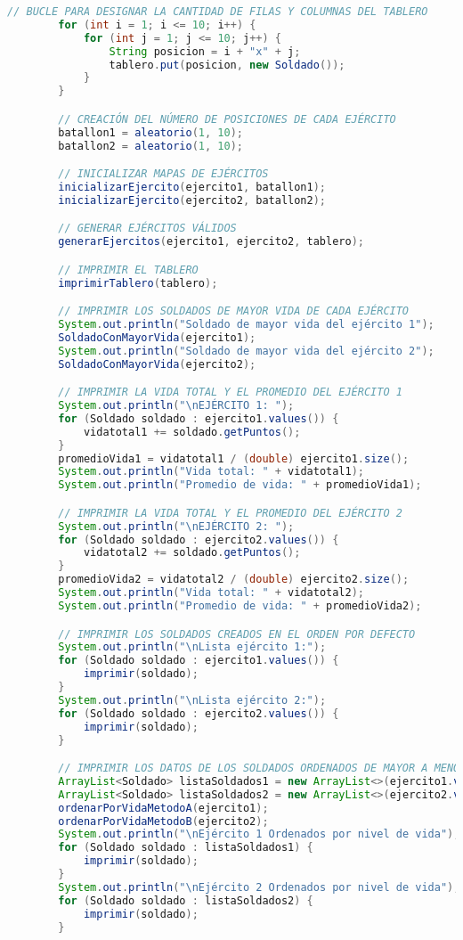 \documentclass{article}
\begin{document}
\begin{itemize}
\begin{itemize}
\begin{lstlisting}[language=java]
        // BUCLE PARA DESIGNAR LA CANTIDAD DE FILAS Y COLUMNAS DEL TABLERO
        for (int i = 1; i <= 10; i++) {
            for (int j = 1; j <= 10; j++) {
                String posicion = i + "x" + j;
                tablero.put(posicion, new Soldado());
            }
        }

        // CREACIÓN DEL NÚMERO DE POSICIONES DE CADA EJÉRCITO
        batallon1 = aleatorio(1, 10);
        batallon2 = aleatorio(1, 10);

        // INICIALIZAR MAPAS DE EJÉRCITOS
        inicializarEjercito(ejercito1, batallon1);
        inicializarEjercito(ejercito2, batallon2);

        // GENERAR EJÉRCITOS VÁLIDOS
        generarEjercitos(ejercito1, ejercito2, tablero);

        // IMPRIMIR EL TABLERO
        imprimirTablero(tablero);

        // IMPRIMIR LOS SOLDADOS DE MAYOR VIDA DE CADA EJÉRCITO
        System.out.println("Soldado de mayor vida del ejército 1");
        SoldadoConMayorVida(ejercito1);
        System.out.println("Soldado de mayor vida del ejército 2");
        SoldadoConMayorVida(ejercito2);

        // IMPRIMIR LA VIDA TOTAL Y EL PROMEDIO DEL EJÉRCITO 1
        System.out.println("\nEJÉRCITO 1: ");
        for (Soldado soldado : ejercito1.values()) {
            vidatotal1 += soldado.getPuntos();
        }
        promedioVida1 = vidatotal1 / (double) ejercito1.size();
        System.out.println("Vida total: " + vidatotal1);
        System.out.println("Promedio de vida: " + promedioVida1);

        // IMPRIMIR LA VIDA TOTAL Y EL PROMEDIO DEL EJÉRCITO 2
        System.out.println("\nEJÉRCITO 2: ");
        for (Soldado soldado : ejercito2.values()) {
            vidatotal2 += soldado.getPuntos();
        }
        promedioVida2 = vidatotal2 / (double) ejercito2.size();
        System.out.println("Vida total: " + vidatotal2);
        System.out.println("Promedio de vida: " + promedioVida2);

        // IMPRIMIR LOS SOLDADOS CREADOS EN EL ORDEN POR DEFECTO
        System.out.println("\nLista ejército 1:");
        for (Soldado soldado : ejercito1.values()) {
            imprimir(soldado);
        }
        System.out.println("\nLista ejército 2:");
        for (Soldado soldado : ejercito2.values()) {
            imprimir(soldado);
        }

        // IMPRIMIR LOS DATOS DE LOS SOLDADOS ORDENADOS DE MAYOR A MENOR DEPENDIENDO DE SU NIVEL DE VIDA
        ArrayList<Soldado> listaSoldados1 = new ArrayList<>(ejercito1.values());
        ArrayList<Soldado> listaSoldados2 = new ArrayList<>(ejercito2.values());
        ordenarPorVidaMetodoA(ejercito1);
        ordenarPorVidaMetodoB(ejercito2);
        System.out.println("\nEjército 1 Ordenados por nivel de vida");
        for (Soldado soldado : listaSoldados1) {
            imprimir(soldado);
        }
        System.out.println("\nEjército 2 Ordenados por nivel de vida");
        for (Soldado soldado : listaSoldados2) {
            imprimir(soldado);
        }


\end{lstlisting}
\end{itemize}
\end{itemize}
\end{document}
